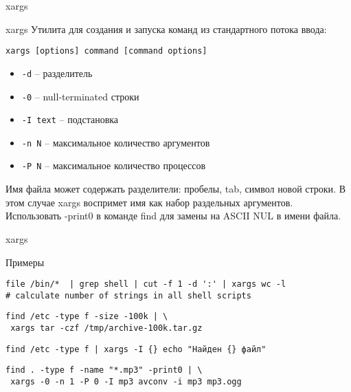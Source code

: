 \begin{frame}[fragile]{xargs}
	\begin{block}{xargs}
			Утилита для создания и запуска команд из стандартного потока ввода:
		\begin{verbatim}
xargs [options] command [command options]
                \end{verbatim}
		\begin{itemize}
			\item {\tt -d} -- разделитель
			\item {\tt -0} -- null-terminated строки
			\item {\tt -I text} -- подстановка
			\item {\tt -n N} -- максимальное количество аргументов
			\item {\tt -P N} -- максимальное количество процессов
		\end{itemize}

	\end{block}
Имя файла может содержать разделители: пробелы, tab, символ новой строки. В этом случае xargs воспримет имя как набор раздельных аргументов. Использовать -print0 в команде find для замены на ASCII NUL в имени файла.
\end{frame}

\begin{frame}[fragile]{xargs}
	\begin{block}{Примеры}
		\begin{verbatim}
file /bin/*  | grep shell | cut -f 1 -d ':' | xargs wc -l 
# calculate number of strings in all shell scripts
                \end{verbatim}
		\begin{verbatim}
find /etc -type f -size -100k | \
 xargs tar -czf /tmp/archive-100k.tar.gz
                \end{verbatim}
		\begin{verbatim}
find /etc -type f | xargs -I {} echo "Найден {} файл"
                \end{verbatim}

		\begin{verbatim}
find . -type f -name "*.mp3" -print0 | \
 xargs -0 -n 1 -P 0 -I mp3 avconv -i mp3 mp3.ogg
                \end{verbatim}
	
	\end{block}
\end{frame}
